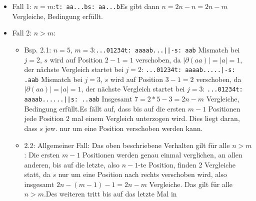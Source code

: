 \documentclass[a4paper,10pt,oneside,leqno]{scrartcl}
\begin{document}
\begin{itemize}
 \item Fall 1: $n=m$:\newline \texttt{t: aa...b}\newline \texttt{s: aa...b}\newline Es gibt dann $n= 2n-n = 2n-m$ Vergleiche, Bedingung erfüllt.
 \item Fall 2: $n>m$:\newline
\begin{itemize}
 \item Bsp. 2.1: $n=5$, $m=3$:\newline \texttt{...01234}\newline \texttt{t: aaaab}\newline \texttt{...||-}\newline\texttt{s: aab} \newline
 Mismatch bei $j=2$, $s$ wird auf Position $2-1=1$ verschoben, da $|\partial(aa)| = |a| = 1$, der nächste Vergleich startet bei $j=2$:\newline
 \texttt{...01234}\newline \texttt{t: aaaab}\newline \texttt{.....|-}\newline\texttt{s: .aab} \newline
  Mismatch bei $j=3$, $s$ wird auf Position $3-1=2$ verschoben, da $|\partial(aa)| = |a| = 1$, der nächste Vergleich startet bei $j=3$:\newline
  \texttt{...01234}\newline \texttt{t: aaaab}\newline \texttt{......||}\newline\texttt{s: ..aab} \newline
  Insgesamt $7 = 2*5-3 = 2n-m$ Vergleiche, Bedingung erfüllt.\newline Es fällt auf, dass bis auf die ersten $m-1$ Positionen jede Position
  2 mal einem Vergleich unterzogen wird. Dies liegt daran, dass $s$ jew. nur um eine Position verschoben werden kann.
  \item 2.2: Allgemeiner Fall:\newline
  Das oben beschriebene Verhalten gilt für alle $n>m$: Die ersten $m-1$ Positionen werden genau einmal verglichen, an allen anderen, bis auf
  die letzte, also $n-1$-te Position, finden 2 Vergleiche statt, da $s$ nur um eine Position nach rechts verschoben wird, also insgesamt
  $2n-(m-1)-1 = 2n-m$ Vergleiche. Das gilt für alle $n>m$.\newline Des weiteren tritt bis auf das letzte Mal in

\end{itemize}
\end{itemize}
\end{document}
